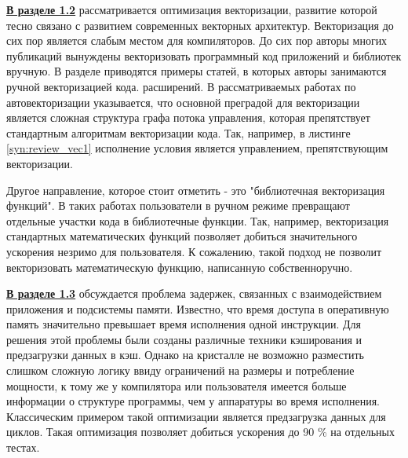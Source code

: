 \underline{\textbf{В разделе 1.2}}  рассматривается оптимизация векторизации, развитие которой
тесно связано с развитием современных векторных архитектур. Векторизация до сих пор является слабым местом для компиляторов. До сих пор авторы многих публикаций вынуждены векторизовать программный код приложений и библиотек вручную.  В разделе приводятся примеры статей, в которых авторы занимаются ручной векторизацией кода.  
расширений. В рассматриваемых работах по автовекторизации указывается, что основной
преградой для векторизации является сложная структура графа потока управления,
которая препятствует стандартным алгоритмам векторизации кода. Так,
например, в листинге \ref{syn:review_vec1} исполнение условия является управлением, препятствующим
векторизации.


Другое направление, которое стоит отметить - это "библиотечная векторизация функций". В таких работах пользователи в ручном режиме превращают отдельные участки кода в библиотечные функции. Так, например, векторизация стандартных математических
функций  позволяет добиться значительного ускорения незримо для пользователя.
К сожалению, такой подход не позволит векторизовать математическую
функцию, написанную собственноручно.

\underline{\textbf{В разделе 1.3}} обсуждается проблема задержек, связанных с взаимодействием
приложения и подсистемы памяти. Известно, что время доступа в оперативную
память значительно превышает время исполнения одной инструкции.
Для решения этой проблемы были созданы различные техники кэширования и
предзагрузки данных в кэш. Однако на кристалле не возможно разместить
слишком сложную логику ввиду ограничений на размеры и потребление
мощности, к тому же у компилятора или пользователя имеется больше информации
о структуре программы, чем у аппаратуры во время исполнения. Классическим примером такой оптимизации является предзагрузка данных
для циклов. Такая оптимизация позволяет добиться ускорения до 90 \%  на отдельных тестах.

